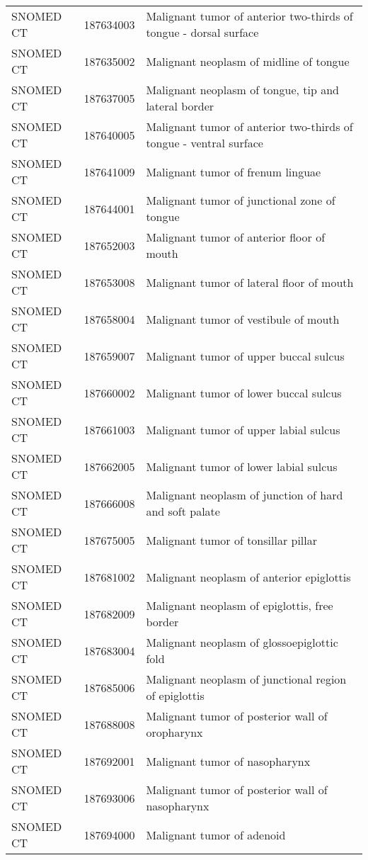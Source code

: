 \begin{longtable}{p{}p{}p{}}
  SNOMED CT & 187634003 & Malignant tumor of anterior two-thirds of tongue - dorsal surface \\ 
  SNOMED CT & 187635002 & Malignant neoplasm of midline of tongue \\ 
  SNOMED CT & 187637005 & Malignant neoplasm of tongue, tip and lateral border \\ 
  SNOMED CT & 187640005 & Malignant tumor of anterior two-thirds of tongue - ventral surface \\ 
  SNOMED CT & 187641009 & Malignant tumor of frenum linguae \\ 
  SNOMED CT & 187644001 & Malignant tumor of junctional zone of tongue \\ 
  SNOMED CT & 187652003 & Malignant tumor of anterior floor of mouth \\ 
  SNOMED CT & 187653008 & Malignant tumor of lateral floor of mouth \\ 
  SNOMED CT & 187658004 & Malignant tumor of vestibule of mouth \\ 
  SNOMED CT & 187659007 & Malignant tumor of upper buccal sulcus \\ 
  SNOMED CT & 187660002 & Malignant tumor of lower buccal sulcus \\ 
  SNOMED CT & 187661003 & Malignant tumor of upper labial sulcus \\ 
  SNOMED CT & 187662005 & Malignant tumor of lower labial sulcus \\ 
  SNOMED CT & 187666008 & Malignant neoplasm of junction of hard and soft palate \\ 
  SNOMED CT & 187675005 & Malignant tumor of tonsillar pillar \\ 
  SNOMED CT & 187681002 & Malignant neoplasm of anterior epiglottis \\ 
  SNOMED CT & 187682009 & Malignant neoplasm of epiglottis, free border \\ 
  SNOMED CT & 187683004 & Malignant neoplasm of glossoepiglottic fold \\ 
  SNOMED CT & 187685006 & Malignant neoplasm of junctional region of epiglottis \\ 
  SNOMED CT & 187688008 & Malignant tumor of posterior wall of oropharynx \\ 
  SNOMED CT & 187692001 & Malignant tumor of nasopharynx \\ 
  SNOMED CT & 187693006 & Malignant tumor of posterior wall of nasopharynx \\ 
  SNOMED CT & 187694000 & Malignant tumor of adenoid \\ 

\end{longtable}
